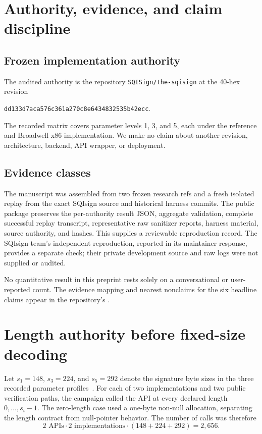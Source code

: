 \documentclass[11pt]{article}
\newcommand{\code}[1]{\texttt{#1}}
\begin{document}
\section{Authority, evidence, and claim discipline}

\subsection{Frozen implementation authority}

The audited authority is the repository \code{SQISign/the-sqisign} at the
40-hex revision
\begin{center}
\code{dd133d7aca576c361a270c8e6434832535b42ecc}.
\end{center}
The recorded matrix covers parameter levels 1, 3, and 5, each under the
reference and Broadwell x86 implementation.  We make no claim about another
revision, architecture, backend, API wrapper, or deployment.

\subsection{Evidence classes}

The manuscript was assembled from two frozen research refs and a fresh
isolated replay from the exact SQIsign source and historical harness commits.
The public package preserves the per-authority result JSON, aggregate
validation, complete successful replay transcript, representative raw
sanitizer reports, harness material, source authority, and hashes.  This
supplies a reviewable reproduction record.  The SQIsign team's independent
reproduction, reported in its maintainer response, provides a separate check;
their private development source and raw logs were not supplied or audited.

No quantitative result in this preprint rests solely on a conversational or
user-reported count.  The evidence mapping and nearest nonclaims for the six
headline claims appear in the repository's .

\section{Length authority before fixed-size decoding}

Let $s_1=148$, $s_3=224$, and $s_5=292$ denote the signature byte sizes in the
three recorded parameter profiles~\cite{sqisign-spec-2025}.  For each of two
implementations and two
public verification paths, the campaign called the API at every declared
length $0,\ldots,s_i-1$.  The zero-length case used a one-byte non-null
allocation, separating the length contract from null-pointer behavior.  The
number of calls was therefore
\[
  2\text{ APIs}\cdot 2\text{ implementations}\cdot
  (148+224+292)=2{,}656.
\]
\end{document}
